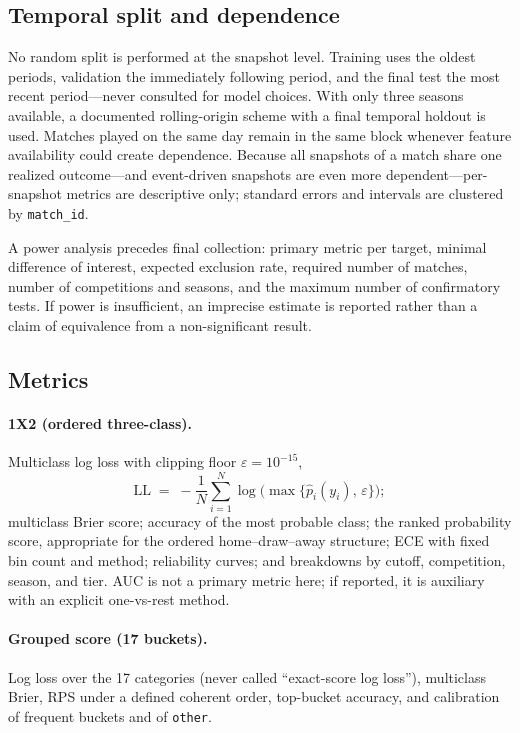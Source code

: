 \documentclass[11pt]{article}
\newcommand{\eps}{\varepsilon}
\begin{document}
\subsection{Temporal split and dependence}
\label{sec:split}

No random split is performed at the snapshot level. Training uses the oldest
periods, validation the immediately following period, and the final test the
most recent period---never consulted for model choices. With only three
seasons available, a documented rolling-origin scheme with a final temporal
holdout is used. Matches played on the same day remain in the same block
whenever feature availability could create dependence. Because all snapshots
of a match share one realized outcome---and event-driven snapshots are even
more dependent---per-snapshot metrics are descriptive only; standard errors
and intervals are clustered by \texttt{match\_id}.

A power analysis precedes final collection: primary metric per target,
minimal difference of interest, expected exclusion rate, required number of
matches, number of competitions and seasons, and the maximum number of
confirmatory tests. If power is insufficient, an imprecise estimate is
reported rather than a claim of equivalence from a non-significant result.

\subsection{Metrics}
\label{sec:metrics}

\paragraph{1X2 (ordered three-class).}
Multiclass log loss with clipping floor $\eps=10^{-15}$,
\begin{equation}
\mathrm{LL} \;=\; -\frac{1}{N}\sum_{i=1}^{N}
\log\!\big(\max\{\hat p_i(y_i),\,\eps\}\big);
\end{equation}
multiclass Brier score; accuracy of the most probable class; the ranked
probability score, appropriate for the ordered home--draw--away structure;
ECE with fixed bin count and method; reliability curves; and breakdowns by
cutoff, competition, season, and tier. AUC is not a primary metric here; if
reported, it is auxiliary with an explicit one-vs-rest method.

\paragraph{Grouped score (17 buckets).}
Log loss over the 17 categories (never called ``exact-score log loss''),
multiclass Brier, RPS under a defined coherent order, top-bucket accuracy,
and calibration of frequent buckets and of \texttt{other}.
\end{document}
